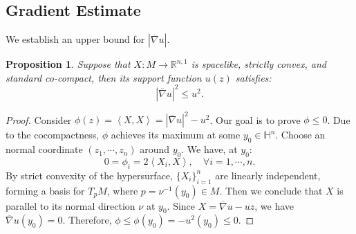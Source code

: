 \documentclass[reqno]{amsart}
\newtheorem{proposition}[theorem]{Proposition}
\theoremstyle{remark}
\newcommand{\abs}[1]{\left\lvert{#1}\right\rvert}
\newcommand{\R}{\ensuremath{\mathbb{R}}}
\renewcommand{\H}{{\mathbb{H}}}
\newcommand{\ip}[2]{\ensuremath{\left< {#1}, {#2} \right>}}
\newcommand{\bnabla}{\overline{\nabla}}
\theoremstyle{definition}
\numberwithin{equation}{section}
\begin{document}
\subsection{Gradient Estimate}
We establish an upper bound for \(\abs{\bnabla u}\).
\begin{proposition}\label{prop:gradient-estimate}
    Suppose that \(X:M\to \R^{n,1}\) is spacelike, strictly convex, and standard co-compact, then its support function \(u(z)\) satisfies:
    \begin{equation}\label{eq:gradient-estimate}
        \abs{\bnabla u}^2 \leq u^2.
    \end{equation}
\end{proposition}
\begin{proof}
    Consider \( \phi(z) = \ip{X}{X} = \abs{\bnabla u}^2 - u^2 \). Our goal is to prove \(\phi \leq 0\). Due to the cocompactness, \(\phi\) achieves its maximum at some \(y_0 \in \H^n\). Choose an normal coordinate \((z_1,\cdots,z_n)\) around \(y_0\). We have, at \(y_0\):  
    \[ 0 = \phi_i = 2\ip{X_i}{X}, \quad \forall i=1,\cdots,n.  \]
    By strict convexity of the hypersurface, \(\{X_i\}_{i=1}^n\) are linearly independent, forming a basis for \(T_p M\), where \(p = \nu^{-1}(y_0)\in M\). Then we conclude that \(X\) is parallel to its normal direction \(\nu\) at \(y_0\). Since \(X = \bnabla u - uz\), we have \(\bnabla u (y_0) = 0\). Therefore, \(\phi \leq \phi(y_0) = -u^2(y_0)\leq 0\).

\end{proof}
\end{document}
